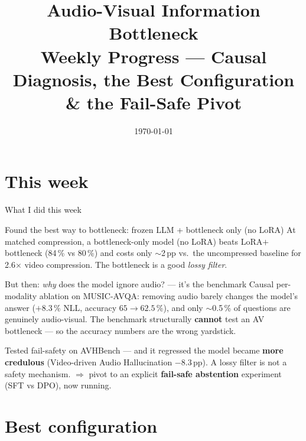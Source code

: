 \documentclass[10pt,aspectratio=169]{beamer}
\title[av\_ib Weekly Progress]{Audio-Visual Information Bottleneck\\
       \normalfont\normalsize Weekly Progress --- Causal Diagnosis, the Best Configuration \& the Fail-Safe Pivot}
\subtitle{}
\author{}
\institute{}
\date{\today}
\begin{document}
\frame{\titlepage}

\section{This week}

\begin{frame}{What I did this week}

\begin{block}{Found the best way to bottleneck: frozen LLM + bottleneck only (no LoRA)}
  At matched compression, a bottleneck-only model (no LoRA) beats
  LoRA$+$bottleneck (84\,\% vs 80\,\%) and costs only $\sim$2\,pp vs.\ the
  uncompressed baseline for 2.6$\times$ video compression. The bottleneck is a
  good \emph{lossy filter}.
\end{block}

\begin{block}{But then: \emph{why} does the model ignore audio? --- it's the benchmark}
  Causal per-modality ablation on MUSIC-AVQA: removing audio barely changes the
  model's answer ($+8.3$\,\% NLL, accuracy $65\to62.5$\,\%), and only
  $\sim$0.5\,\% of questions are genuinely audio-visual. The benchmark
  structurally \textbf{cannot} test an AV bottleneck --- so the accuracy numbers
  are the wrong yardstick.
\end{block}

\begin{block}{Tested fail-safety on AVHBench --- and it regressed}
  the model became \textbf{more credulous} (Video-driven Audio Hallucination
  $-8.3$\,pp). A lossy filter is not a safety mechanism. $\Rightarrow$ pivot to
  an explicit \textbf{fail-safe abstention} experiment (SFT vs DPO), now running.
\end{block}

\end{frame}

\section{Best configuration}
\end{document}
